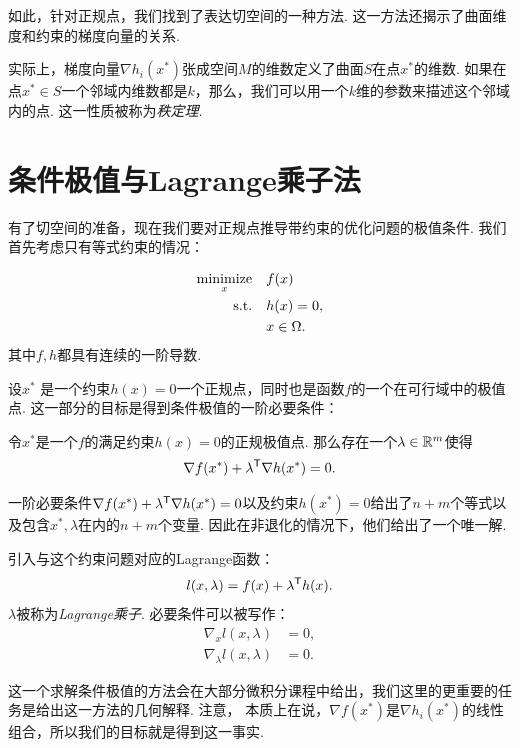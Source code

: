 如此，针对正规点，我们找到了表达切空间的一种方法. 这一方法还揭示了曲面维度和约束的梯度向量的关系.

\begin{remark}
    实际上，梯度向量$\nabla h_i(x^*)$张成空间$M$的维数定义了曲面$S$在点$x^*$的维数. 如果在点$x^*\in S$一个邻域内维数都是$k$，那么，我们可以用一个$k$维的参数来描述这个邻域内的点. 这一性质被称为\emph{秩定理}.
\end{remark}

\section{条件极值与Lagrange乘子法}\label{sec:lagrange-multiplier}

有了切空间的准备，现在我们要对正规点推导带约束的优化问题的极值条件. 我们首先考虑只有等式约束的情况：

\begin{equation}
\begin{aligned}
\operatorname*{minimize}_x\quad& f(x) \\
\text{s.t.}\quad& {h}(x)={0},\\
& x \in \Omega.
\end{aligned}    \label{eq:eq-constraint-only-differentiable}
\end{equation}
其中$f,h$都具有连续的一阶导数.

设$x^*$ 是一个约束$h(x)=0$一个正规点，同时也是函数$f$的一个在可行域中的极值点. 这一部分的目标是得到条件极值的一阶必要条件：
\begin{theorem}[条件极值的一阶必要条件]\label{thm:eq-opt-cond-1}
    令$x^*$是一个$f$的满足约束${h(x)=0}$的正规极值点. 那么存在一个${\lambda}\in \mathbb{R}^m$使得$$\nabla f(x^*)+{\lambda^{\mathsf{T}} \nabla h(x^*)=0}. $$
\end{theorem}

一阶必要条件$\nabla f(x^*)+{\lambda^{\mathsf{T}}}\nabla {h(x^*)=0}$以及约束${h(x^*)=0}$给出了$n+m$个等式以及包含${x^*,\lambda}$在内的$n+m$个变量. 因此在非退化的情况下，他们给出了一个唯一解. 

引入与这个约束问题对应的Lagrange函数：
        $$l({x,\lambda})=f(x)+{\lambda^{\mathsf{T}} h(x)}.$$
$\lambda$被称为\emph{Lagrange乘子}. 必要条件可以被写作：
\begin{align*}
    \nabla_x l({x,\lambda})&=0,\\
    \nabla_{\lambda} l({x,\lambda})&=0.
\end{align*}

这一个求解条件极值的方法会在大部分微积分课程中给出，我们这里的更重要的任务是给出这一方法的几何解释. 注意， 本质上在说，$\nabla f(x^*)$是$\nabla h_i(x^*)$的线性组合，所以我们的目标就是得到这一事实. 

